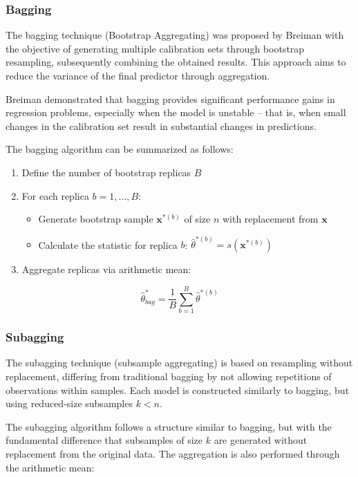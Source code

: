 \documentclass[12pt]{article}
\begin{document}
\subsubsection{Bagging}

The bagging technique (Bootstrap Aggregating) was proposed by Breiman\cite{Breiman:1996} with the objective of generating multiple calibration sets through bootstrap resampling, subsequently combining the obtained results. This approach aims to reduce the variance of the final predictor through aggregation.

Breiman demonstrated that bagging provides significant performance gains in regression problems, especially when the model is unstable – that is, when small changes in the calibration set result in substantial changes in predictions.\cite{Shabbir:2024,Hong:2020}

The bagging algorithm can be summarized as follows:

\begin{enumerate}
\item Define the number of bootstrap replicas $B$
\item For each replica $b = 1, \ldots, B$:
   \begin{itemize}
   \item Generate bootstrap sample $\mathbf{x}^{*(b)}$ of size $n$ with replacement from $\mathbf{x}$
   \item Calculate the statistic for replica $b$: $\hat{\theta}^{*(b)} = s(\mathbf{x}^{*(b)})$
   \end{itemize}
\item Aggregate replicas via arithmetic mean:
\end{enumerate}

\begin{equation}
\hat{\theta}^*_{bag} = \frac{1}{B}\sum_{b=1}^{B}\hat{\theta}^{*(b)}
\end{equation}

\subsubsection{Subagging}

The subagging technique (subsample aggregating) is based on resampling without replacement, differing from traditional bagging by not allowing repetitions of observations within samples.\cite{Silva:2020,Buhlmann:2003} Each model is constructed similarly to bagging, but using reduced-size subsamples $k < n$.

The subagging algorithm follows a structure similar to bagging, but with the fundamental difference that subsamples of size $k$ are generated without replacement from the original data. The aggregation is also performed through the arithmetic mean:
\end{document}
